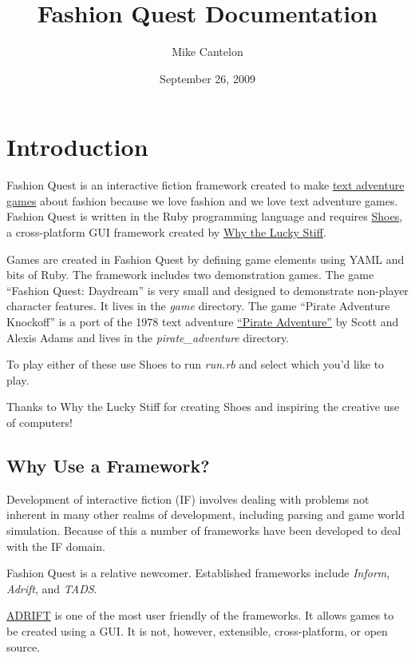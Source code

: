 \documentclass[letterpaper,10pt,english]{manual}
\title{Fashion Quest Documentation}
\date{September 26, 2009}
\author{Mike Cantelon}
\begin{document}
\maketitle
\tableofcontents
\hypertarget{--doc-index}{}


\resetcurrentobjects
\hypertarget{--doc-introduction}{}

\chapter{Introduction}

Fashion Quest is an interactive fiction framework created to make \href{http://en.wikipedia.org/wiki/Interactive\_fiction}{text adventure games} about fashion because we love fashion and we love text adventure games. Fashion Quest is written in the Ruby programming language and requires \href{http://shoes.heroku.com/}{Shoes}, a cross-platform GUI framework created by \href{http://en.wikipedia.org/wiki/Why\_the\_lucky\_stiff/}{Why the Lucky Stiff}.

Games are created in Fashion Quest by defining game elements using YAML and bits of Ruby. The framework includes two demonstration games. The game ``Fashion Quest: Daydream'' is very small and designed to demonstrate non-player character features. It lives in the \emph{game} directory. The game ``Pirate Adventure Knockoff'' is a port of the 1978 text adventure \href{http://en.wikipedia.org/wiki/Pirate\_Adventure}{``Pirate Adventure''} by Scott and Alexis Adams and lives in the \emph{pirate\_adventure} directory.

To play either of these use Shoes to run \emph{run.rb} and select which you’d like to play.

Thanks to Why the Lucky Stiff for creating Shoes and inspiring the creative use of computers!


\section{Why Use a Framework?}

Development of interactive fiction (IF) involves dealing with problems not inherent in many other realms of development, including parsing and game world simulation. Because of this a number of frameworks have been developed to deal with the IF domain.

Fashion Quest is a relative newcomer. Established frameworks include \emph{Inform}, \emph{Adrift}, and \emph{TADS}.

\href{http://www.adrift.org.uk/}{ADRIFT} is one of the most user friendly of the frameworks. It allows games to be created using a GUI. It is not, however, extensible, cross-platform, or open source.
\end{document}
